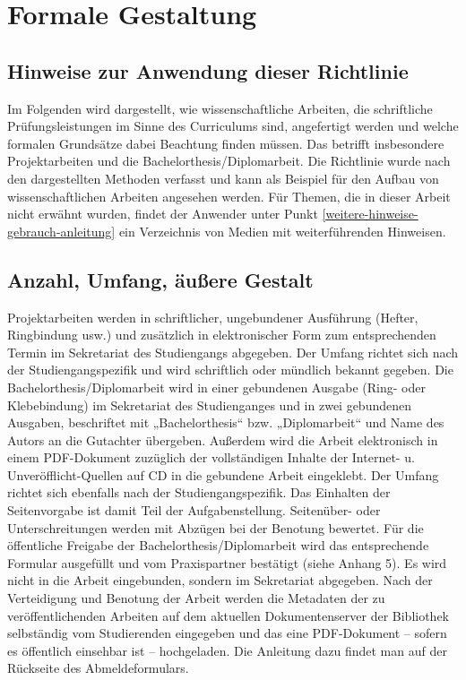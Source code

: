 \chapter{Formale Gestaltung}
\label{formal}
\section{Hinweise zur Anwendung dieser Richtlinie}
\label{formal-hinweise}
Im Folgenden wird dargestellt, wie wissenschaftliche Arbeiten, die schriftliche Prüfungsleistungen im Sinne des Curriculums sind, angefertigt werden und welche formalen Grundsätze dabei Beachtung finden müssen.
Das betrifft insbesondere Projektarbeiten und die Bachelorthesis/Diplomarbeit.
Die Richtlinie wurde nach den dargestellten Methoden verfasst und kann als Beispiel für den Aufbau von wissenschaftlichen Arbeiten angesehen werden.
Für Themen, die in dieser Arbeit nicht erwähnt wurden, findet der Anwender unter Punkt \ref{weitere-hinweise-gebrauch-anleitung} ein Verzeichnis von Medien mit weiterführenden Hinweisen.
\section{Anzahl, Umfang, äußere Gestalt}
\label{formal-anzahl-umfang-gestalt}
Projektarbeiten werden in schriftlicher, ungebundener Ausführung (Hefter, Ringbindung usw.) und zusätzlich in elektronischer Form zum entsprechenden Termin im Sekretariat des Studiengangs abgegeben.
Der Umfang richtet sich nach der Studiengangspezifik und wird schriftlich oder mündlich bekannt gegeben.
Die Bachelorthesis/Diplomarbeit wird in einer gebundenen Ausgabe (Ring- oder Klebebindung) im Sekretariat des Studienganges und in zwei gebundenen Ausgaben, beschriftet mit „Bachelorthesis“ bzw. „Diplomarbeit“ und Name des Autors an die Gutachter übergeben.
Außerdem wird die Arbeit elektronisch in einem \ac{PDF}-Dokument zuzüglich der vollständigen Inhalte der Internet- u. Unveröfflicht-Quellen auf \ac{CD} in die gebundene Arbeit eingeklebt.
Der Umfang richtet sich ebenfalls nach der Studiengangspezifik.
Das Einhalten der Seitenvorgabe ist damit Teil der Aufgabenstellung.
Seitenüber- oder Unterschreitungen werden mit Abzügen bei der Benotung bewertet.
Für die öffentliche Freigabe der Bachelorthesis/Diplomarbeit wird das entsprechende Formular ausgefüllt und vom Praxispartner bestätigt (siehe Anhang 5). %
Es wird nicht in die Arbeit eingebunden, sondern im Sekretariat abgegeben.
Nach der Verteidigung und Benotung der Arbeit werden die Metadaten der zu veröffentlichenden Arbeiten auf dem aktuellen Dokumentenserver der Bibliothek selbständig vom Studierenden eingegeben und das eine \ac{PDF}-Dokument – sofern es öffentlich einsehbar ist – hochgeladen.
Die Anleitung dazu findet man auf der Rückseite des Abmeldeformulars.

